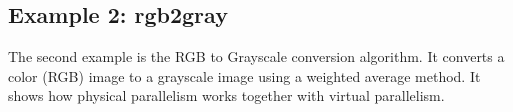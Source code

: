 \subsection*{Example 2: rgb2gray}

The second example is the RGB to Grayscale conversion algorithm. It converts a color (RGB) image to a grayscale image using a weighted average method. It shows how physical parallelism works together with virtual parallelism.
